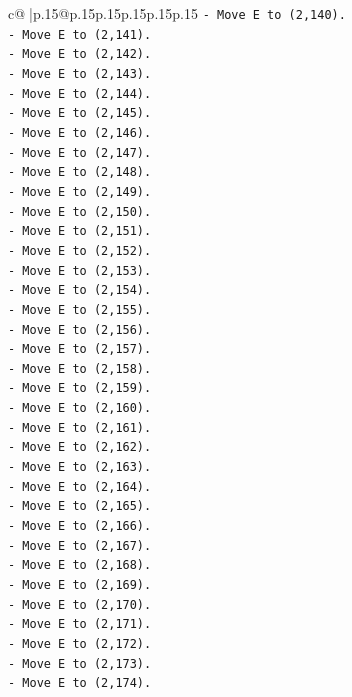 \documentclass{article}
\begin{document}
{\begin{supertabular}{c@{$\;$}|p{.15\linewidth}@{}p{.15\linewidth}p{.15\linewidth}p{.15\linewidth}p{.15\linewidth}p{.15\linewidth}}
{{{\texttt{{-} Move E to (2,140).} \\
\texttt{{-} Move E to (2,141).} \\
\texttt{{-} Move E to (2,142).} \\
\texttt{{-} Move E to (2,143).} \\
\texttt{{-} Move E to (2,144).} \\
\texttt{{-} Move E to (2,145).} \\
\texttt{{-} Move E to (2,146).} \\
\texttt{{-} Move E to (2,147).} \\
\texttt{{-} Move E to (2,148).} \\
\texttt{{-} Move E to (2,149).} \\
\texttt{{-} Move E to (2,150).} \\
\texttt{{-} Move E to (2,151).} \\
\texttt{{-} Move E to (2,152).} \\
\texttt{{-} Move E to (2,153).} \\
\texttt{{-} Move E to (2,154).} \\
\texttt{{-} Move E to (2,155).} \\
\texttt{{-} Move E to (2,156).} \\
\texttt{{-} Move E to (2,157).} \\
\texttt{{-} Move E to (2,158).} \\
\texttt{{-} Move E to (2,159).} \\
\texttt{{-} Move E to (2,160).} \\
\texttt{{-} Move E to (2,161).} \\
\texttt{{-} Move E to (2,162).} \\
\texttt{{-} Move E to (2,163).} \\
\texttt{{-} Move E to (2,164).} \\
\texttt{{-} Move E to (2,165).} \\
\texttt{{-} Move E to (2,166).} \\
\texttt{{-} Move E to (2,167).} \\
\texttt{{-} Move E to (2,168).} \\
\texttt{{-} Move E to (2,169).} \\
\texttt{{-} Move E to (2,170).} \\
\texttt{{-} Move E to (2,171).} \\
\texttt{{-} Move E to (2,172).} \\
\texttt{{-} Move E to (2,173).} \\
\texttt{{-} Move E to (2,174).} \\
}}}
\end{supertabular}}
\end{document}
